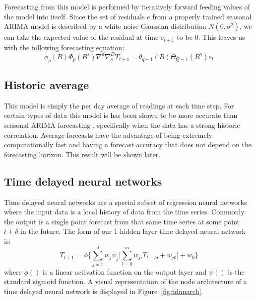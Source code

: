 \documentclass{acm_proc_article-sp}
\begin{document}
Forecasting from this model is performed by iteratively forward feeding values of the model into itself.  Since the set of residuals $e$ from a properly trained seasonal ARIMA model is described by a white noise Gaussian distribution $N(0, \sigma^{2})$, we can take the expected value of the residual at time $e_{t + 1}$ to be 0.  This leaves us with the following forecasting equation: 
\begin{equation}
\label{eq:sarima}
\phi_{p}(B)\Phi_{p}(B^{s})\nabla^{d}\nabla^{D}_{s}T_{t + 1} = \theta_{q - 1}(B)\Theta_{Q - 1}(B^{s})e_{t}
\end{equation}

\subsection{Historic average}
This model is simply the per day average of readings at each time step.  For certain types of data this model is has been shown to be more accurate than seasonal ARIMA forecasting \cite{Newsham2010}, specifically when the data has a strong historic correlation.  Average forecasts have the advantage of being extremely computationally fast and having a forecast accuracy that does not depend on the forecasting horizon.  This result will be shown later.

\subsection{Time delayed neural networks}

Time delayed neural networks are a special subset of regression neural networks where the input data is a local history of data from the time series.  Commonly the output is a single point forecast from that same time series at some point $t + \delta$ in the future.   The form of our 1 hidden layer time delayed neural network is:
\begin{equation}
T_{t + 1} = \phi \{ \sum_{j = 1}^{J} w_{j}\psi_{j} \bigg[ \sum_{l = 0}^{m}w_{ji}T_{t - l\delta} + w_{j0} \bigg] + w_0 \}
\end{equation}
\noindent where $\phi()$ is a linear activation function on the output layer and $\psi()$ is the standard sigmoid function.  A visual representation of the node architecture of a time delayed neural network is displayed in Figure~\ref{fig:tdnnarch}.
\end{document}

